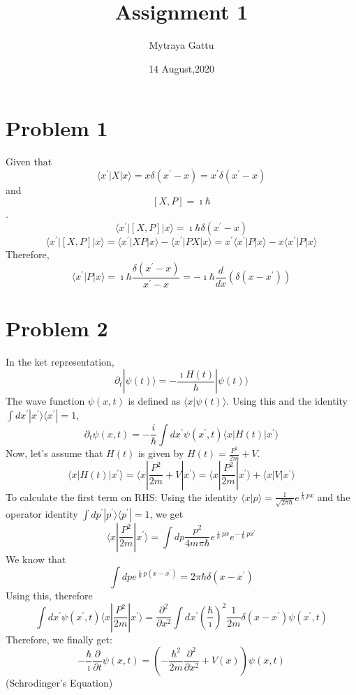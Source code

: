 \documentclass{article}
\title{Assignment 1}
\author{Mytraya Gattu}
\date{14 August,2020}
\begin{document}
\maketitle

\section{Problem 1}
Given that $$\langle x^{\prime} | X | x \rangle = x\delta\left(x^{\prime}-x\right)= x^{\prime}\delta\left(x^{\prime}-x\right)$$ and $$\left[X,P\right] = \imath \hbar$$.
$$\langle x^{\prime} | \left[X,P\right] | x \rangle = \imath \hbar \delta\left(x^{\prime}-x\right)$$
$$\langle x^{\prime} | \left[X,P\right] | x \rangle = \langle x^{\prime} | XP| x \rangle - \langle x^{\prime} | PX| x \rangle = x^{\prime}\langle x^{\prime} | P| x \rangle-x\langle x^{\prime} | P| x \rangle$$
Therefore, 
$$\langle x^{\prime} | P| x \rangle = \imath \hbar \frac{\delta\left(x^{\prime}-x\right)}{x^{\prime}-x} = -\imath \hbar \frac{d}{dx}\left(\delta \left(x-x^{\prime}\right) \right)$$
\section{Problem 2}
In the ket representation, 
$$\partial_{t} |\psi(t) \rangle = -\frac{\imath H(t)}{\hbar} | \psi (t) \rangle$$
The wave function $\psi (x,t) $ is defined as $\langle x | \psi (t) \rangle$. Using this and the identity $\int dx^{\prime} | x^{\prime} \rangle \langle x^{\prime} | = 1$,
$$\partial_{t}\psi(x,t)=-\frac{i}{\hbar}\int dx^{\prime} \psi(x^{\prime},t) \langle x | H(t) | x^{\prime} \rangle$$
Now, let's assume that $H(t)$ is given by $H(t) = \frac{P^2}{2m} + V$.
$$ \langle x | H(t) | x^{\prime} \rangle =  \langle x | \frac{P^2}{2m} + V | x^{\prime} \rangle = \langle x | \frac{P^2}{2m}  | x^{\prime} \rangle + \langle x | V  | x^{\prime} \rangle$$
To calculate the first term on RHS: \newline
Using the identity $\langle x | p \rangle= \frac{1}{\sqrt{2 \pi\hbar}}e^{\frac{\imath}{\hbar} p x}$ and the operator identity $\int dp^{\prime} | p^{\prime} \rangle \langle p^{\prime} | = 1$, we get
$$\langle x | \frac{P^2}{2m} | x^{\prime} \rangle =\int dp \frac{p^2}{4m\pi\hbar} e^{\frac{\imath}{\hbar} p x} e^{-\frac{\imath}{\hbar} p x^{\prime}}$$
We know that $$\int dp e^{\frac{\imath}{\hbar} p (x-x^{\prime})} = 2\pi\hbar\delta(x-x^{\prime})$$
Using this, therefore
$$\int dx^{\prime} \psi (x^{\prime},t) \langle x | \frac{P^2}{2m} | x^{\prime} \rangle =\frac{\partial^{2}}{\partial x^{2}} \int dx^{\prime} (\frac{\hbar}{\imath})^{2} \frac{1}{2 m} \delta (x-x^{\prime}) \psi (x^{\prime},t)$$
Therefore, we finally get:
$$ -\frac{\hbar}{\imath}\frac{\partial}{\partial t}\psi(x,t) = (-\frac{\hbar^2}{2m}\frac{\partial^2}{\partial x^2} + V(x))\psi(x,t)$$
(Schrodinger's Equation)
\end{document}
